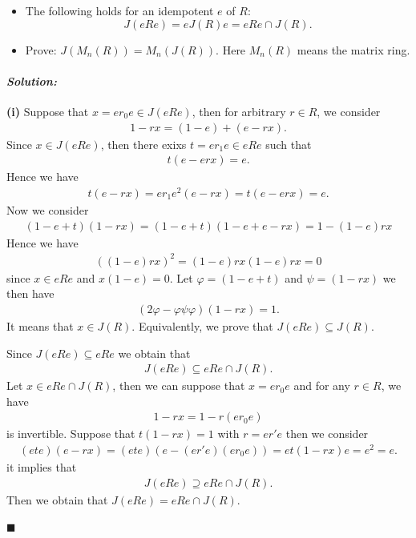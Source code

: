 \documentclass[12pt, a4paper]{article}
\theoremstyle{remark}
\newenvironment{solution}
  {\paragraph{\textit{Solution:}}\par\medskip}
  {\hfill$\blacksquare$\vspace{0.1cm}}
\begin{document}
\begin{itemize}
    \item[(i)] The following holds for an idempotent $e$ of $R$:
    \[ J(eRe) = eJ(R)e = eRe \cap J(R). \]

    \item[(ii)] Prove: $J(M_n(R)) = M_n(J(R))$. Here $M_n(R)$ means the matrix ring.
\end{itemize}
\begin{solution}
    \textbf{(i)} 
    Suppose that $x=er_0e\in J(eRe)$, then for arbitrary $r\in R$, we consider 
    \begin{align*}
        1-rx = (1-e)+(e-rx).
    \end{align*}
    Since $x\in J(eRe)$, then there exixs $t=er_1e\in eRe$ such that 
    \begin{align*}
        t(e-erx) = e.
    \end{align*}
    Hence we have 
    \begin{align*}
        t(e-rx) = er_1e^2(e-rx) = t(e-erx) = e.
    \end{align*}
    Now we consider 
    \begin{align*}
        (1-e+t)(1-rx) = (1-e+t)(1-e+e-rx) = 1-(1-e)rx
    \end{align*}
    Hence we have 
    \begin{align*}
        ((1-e)rx)^2 = (1-e)rx(1-e)rx = 0
    \end{align*}
    since $x\in eRe$ and $x(1-e)=0$.
    Let $\varphi = (1-e+t)$ and $\psi = (1-rx)$ we then have 
    \begin{align*}
        (2\varphi-\varphi\psi\varphi)(1-rx) = 1.
    \end{align*}
    It means that $x\in J(R)$. Equivalently, we prove that $J(eRe)\subseteq J(R)$.

    Since $J(eRe)\subseteq eRe$ we obtain that 
    \begin{align*}
        J(eRe) \subseteq eRe\cap J(R).
    \end{align*}
    Let $x\in eRe\cap J(R)$, then we can suppose that $x=er_0e$ and for any $r\in R$, we have 
    \begin{align*}
        1-rx = 1-r(er_0e)
    \end{align*}
    is invertible. Suppose that $t(1-rx)=1$ with $r=er'e$
    then we consider 
    \begin{align*}
        (ete)(e-rx) = (ete)(e-(er'e)(er_0e)) = et(1-rx)e = e^2 = e.
    \end{align*}
    it implies that 
        \begin{align*}
        J(eRe) \supseteq eRe\cap J(R).
    \end{align*}
    Then we obtain that $J(eRe) = eRe\cap J(R)$. 


\end{solution}
\end{document}
